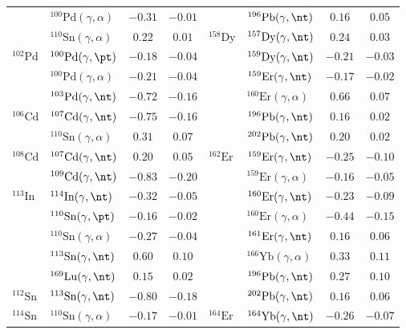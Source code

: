 {\begin{longtable}{llcc llcc}
$ $ & $^{100}\mathrm{Pd}(\gamma,\alpha)$ & $-0.31$ & $-0.01$ & $ $ & $^{196}\mathrm{Pb}(\gamma,\nt)$ & $0.16$ & $0.05$ \\ 
$ $ & $^{110}\mathrm{Sn}(\gamma,\alpha)$ & $0.22$ & $0.01$ & $^{158}\mathrm{Dy}$ & $^{157}\mathrm{Dy}(\gamma,\nt)$ & $0.24$ & $0.03$ \\ 
$^{102}\mathrm{Pd}$ & $^{100}\mathrm{Pd}(\gamma,\pt)$ & $-0.18$ & $-0.04$ & $ $ & $^{159}\mathrm{Dy}(\gamma,\nt)$ & $-0.21$ & $-0.03$ \\ 
$ $ & $^{100}\mathrm{Pd}(\gamma,\alpha)$ & $-0.21$ & $-0.04$ & $ $ & $^{159}\mathrm{Er}(\gamma,\nt)$ & $-0.17$ & $-0.02$ \\ 
$ $ & $^{103}\mathrm{Pd}(\gamma,\nt)$ & $-0.72$ & $-0.16$ & $ $ & $^{160}\mathrm{Er}(\gamma,\alpha)$ & $0.66$ & $0.07$ \\ 
$^{106}\mathrm{Cd}$ & $^{107}\mathrm{Cd}(\gamma,\nt)$ & $-0.75$ & $-0.16$ & $ $ & $^{196}\mathrm{Pb}(\gamma,\nt)$ & $0.16$ & $0.02$ \\ 
$ $ & $^{110}\mathrm{Sn}(\gamma,\alpha)$ & $0.31$ & $0.07$ & $ $ & $^{202}\mathrm{Pb}(\gamma,\nt)$ & $0.20$ & $0.02$ \\ 
$^{108}\mathrm{Cd}$ & $^{107}\mathrm{Cd}(\gamma,\nt)$ & $0.20$ & $0.05$ & $^{162}\mathrm{Er}$ & $^{159}\mathrm{Er}(\gamma,\nt)$ & $-0.25$ & $-0.10$ \\ 
$ $ & $^{109}\mathrm{Cd}(\gamma,\nt)$ & $-0.83$ & $-0.20$ & $ $ & $^{159}\mathrm{Er}(\gamma,\alpha)$ & $-0.16$ & $-0.05$ \\ 
$^{113}\mathrm{In}$ & $^{114}\mathrm{In}(\gamma,\nt)$ & $-0.32$ & $-0.05$ & $ $ & $^{160}\mathrm{Er}(\gamma,\nt)$ & $-0.23$ & $-0.09$ \\ 
$ $ & $^{110}\mathrm{Sn}(\gamma,\pt)$ & $-0.16$ & $-0.02$ & $ $ & $^{160}\mathrm{Er}(\gamma,\alpha)$ & $-0.44$ & $-0.15$ \\ 
$ $ & $^{110}\mathrm{Sn}(\gamma,\alpha)$ & $-0.27$ & $-0.04$ & $ $ & $^{161}\mathrm{Er}(\gamma,\nt)$ & $0.16$ & $0.06$ \\ 
$ $ & $^{113}\mathrm{Sn}(\gamma,\nt)$ & $0.60$ & $0.10$ & $ $ & $^{166}\mathrm{Yb}(\gamma,\alpha)$ & $0.33$ & $0.11$ \\ 
$ $ & $^{169}\mathrm{Lu}(\gamma,\nt)$ & $0.15$ & $0.02$ & $ $ & $^{196}\mathrm{Pb}(\gamma,\nt)$ & $0.27$ & $0.10$ \\ 
$^{112}\mathrm{Sn}$ & $^{113}\mathrm{Sn}(\gamma,\nt)$ & $-0.80$ & $-0.18$ & $ $ & $^{202}\mathrm{Pb}(\gamma,\nt)$ & $0.16$ & $0.06$ \\ 
$^{114}\mathrm{Sn}$ & $^{110}\mathrm{Sn}(\gamma,\alpha)$ & $-0.17$ & $-0.01$ & $^{164}\mathrm{Er}$ & $^{164}\mathrm{Yb}(\gamma,\nt)$ & $-0.26$ & $-0.07$ \\ 

\end{longtable}}
